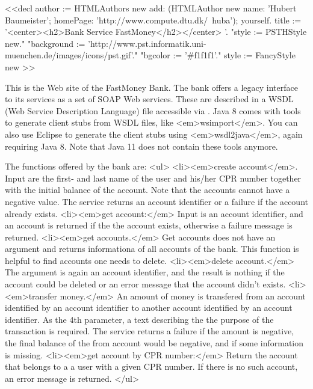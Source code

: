 <<decl
author := HTMLAuthors new add: (HTMLAuthor new name: 'Hubert Baumeister'; homePage: 'http://www.compute.dtu.dk/~huba'); yourself.
title := '<center><h2>Bank Service FastMoney</h2></center> '.
"style := PSTHStyle new."
"background := 'http://www.pst.informatik.uni-muenchen.de/images/icons/pst.gif'."
"bgcolor := '#f1f1f1'."
style := FancyStyle new
>>

This is the Web site of the FastMoney Bank. The bank offers a legacy interface to its services as a set of SOAP Web services. These are described in a WSDL (Web Service Description Language) file accessible via . Java 8 comes with tools to generate client stubs from WSDL files, like <em>wsimport</em>. You can also use Eclipse to generate the client stubs using <em>wsdl2java</em>, again requiring Java 8.  Note that Java 11 does not contain these tools anymore.

The functions offered by the bank are:
<ul>
   <li><em>create account</em>. Input are the first- and last name of the user and his/her CPR number together with the initial balance of the account. Note that the accounts cannot have a negative value. The service returns an account identifier or a failure if the account already exists.
   <li><em>get account:</em> Input is an account identifier, and an account is returned if the the account exists, otherwise a failure message is returned.
   <li><em>get accounts.</em> Get accounts does not have an argument and returns informationa of all accounts of the bank. This function is helpful to find accounts one needs to delete.
   <li><em>delete account.</em> The argument is again an account identifier, and the result is nothing if the account could be deleted or an error message that the account didn't exists.
   <li><em>transfer money.</em> An amount of money is transfered from an account identified by an account identifier to another account identified by an account identifier. As the 4th parameter, a text describing the the purpose of the transaction is required. The service returns a failure if the amount is negative, the final balance of the from account would be negative, and if some information is missing.
   <li><em>get account by CPR number:</em> Return the account that belongs to a a user with a given CPR number. If there is no such account, an error message is returned.
</ul>

